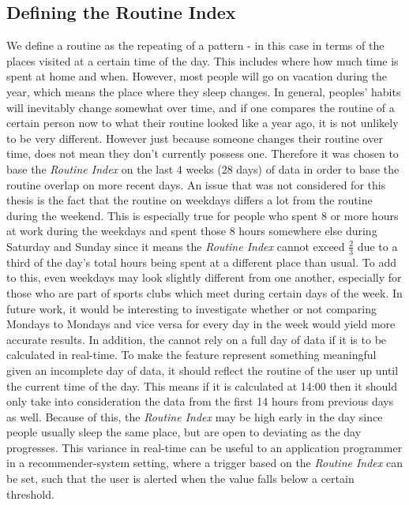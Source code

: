 \subsection{Defining the Routine Index}
We define a routine as the repeating of a pattern - in this case in terms of the places visited at a certain time of the day. This includes where how much time is spent at home and when. However, most people will go on vacation during the year, which means the place where they sleep changes. In general, peoples' habits will inevitably change somewhat over time, and if one compares the routine of a certain person now to what their routine looked like a year ago, it is not unlikely to be very different. However just because someone changes their routine over time, does not mean they don't currently possess one. Therefore it was chosen to base the \textit{Routine Index} on the last 4 weeks (28 days) of data in order to base the routine overlap on more recent days. An issue that was not considered for this thesis is the fact that the routine on weekdays differs a lot from the routine during the weekend. This is especially true for people who spent 8 or more hours at work during the weekdays and spent those 8 hours somewhere else during Saturday and Sunday since it means the \textit{Routine Index} cannot exceed $\frac{2}{3}$ due to a third of the day's total hours being spent at a different place than usual. To add to this, even weekdays may look slightly different from one another, especially for those who are part of sports clubs which meet during certain days of the week. In future work, it would be interesting to investigate whether or not comparing Mondays to Mondays and vice versa for every day in the week would yield more accurate results. In addition, the  cannot rely on a full day of data if it is to be calculated in real-time. To make the feature represent something meaningful given an incomplete day of data, it should reflect the routine of the user up until the current time of the day. This means if it is calculated at 14:00 then it should only take into consideration the data from the first 14 hours from previous days as well. Because of this, the \textit{Routine Index} may be high early in the day since people usually sleep the same place, but are open to deviating as the day progresses. This variance in real-time can be useful to an application programmer in a recommender-system setting, where a trigger based on the \textit{Routine Index} can be set, such that the user is alerted when the value falls below a certain threshold.

